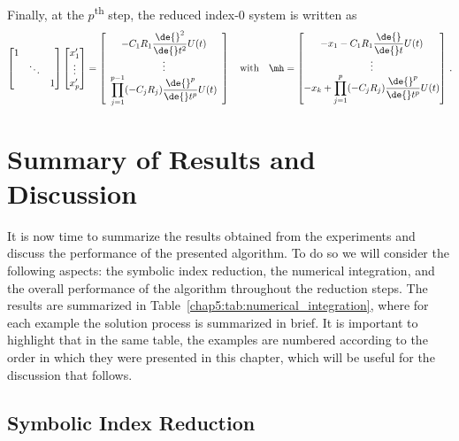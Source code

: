 %
Finally, at the $p$\textsuperscript{th} step, the reduced index-0 system is written as
%
\begin{equation*}
  \begin{bmatrix}
    1 & & \\
    & \ddots & \\
    & & 1 \\
  \end{bmatrix}
  \begin{bmatrix}
    x_1^{\prime} \\ \vdots \\ x_p^{\prime}
  \end{bmatrix} = \left[\begin{array}{c}
    -C_1R_1 \dfrac{\de{}^{2}}{\de{}t^{2}}U(t) \\
    \vdots \\
    \displaystyle\prod_{j=1}^{p-1} (-C_j R_j) \dfrac{\de{}^{p}}{\de{}t^{p}}U(t)
  \end{array}\right]
  \quad \text{with} \quad
  \mh = \begin{bmatrix}
    -x_{1} - C_1R_1 \dfrac{\de{}}{\de{}t}U(t) \\
    \vdots \\
    -x_k + \displaystyle\prod_{j=1}^{p} (-C_j R_j) \dfrac{\de{}^{p}}{\de{}t^{p}}U(t)
  \end{bmatrix} \, \text{.}
\end{equation*}
%


\section{Summary of Results and Discussion}

It is now time to summarize the results obtained from the experiments and discuss the performance of the presented algorithm. To do so we will consider the following aspects: the symbolic index reduction, the numerical integration, and the overall performance of the algorithm throughout the reduction steps. The results are summarized in Table~\ref{chap5:tab:numerical_integration}, where for each example the solution process is summarized in brief. It is important to highlight that in the same table, the examples are numbered according to the order in which they were presented in this chapter, which will be useful for the discussion that follows.

\subsection{Symbolic Index Reduction}

